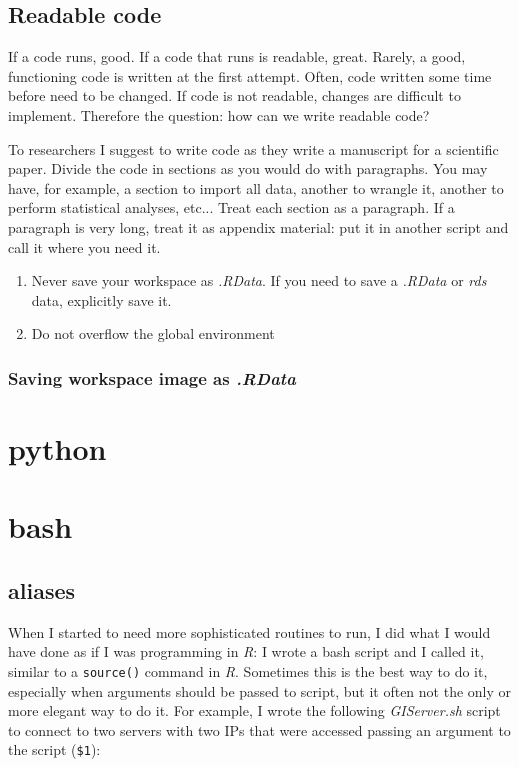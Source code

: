 \documentclass{book}
\begin{document}
\section{Readable code}
If a code runs, good. If a code that runs is readable, great. Rarely, a good, functioning code is written at the first attempt. Often, code written some time before need to be changed. If code is not readable, changes are difficult to implement. Therefore the question: how can we write readable code? 

To researchers I suggest to write code as they write a manuscript for a scientific paper. Divide the code in sections as you would do with paragraphs. You may have, for example, a section to import all data, another to wrangle it, another to perform statistical analyses, etc... Treat each section as a paragraph. If a paragraph is very long, treat it as appendix material: put it in another script and call it where you need it.

\begin{enumerate}
    \item Never save your workspace as \textit{.RData}. If you need to save a \textit{.RData} or \textit{rds} data, explicitly save it. 
    \item Do not overflow the global environment
\end{enumerate}

\subsection{Saving workspace image as \textit{.RData}}

\chapter{python}

\chapter{bash}
\lstset{language=bash}

\section{aliases}
When I started to need more sophisticated routines to run, I did what I would have done as if I was programming in \textit{R}: I wrote a bash script and I called it, similar to a \texttt{source()} command in \textit{R}. Sometimes this is the best way to do it, especially when arguments should be passed to script, but it often not the only or more elegant way to do it. For example, I wrote the following \textit{GIServer.sh} script to connect to two servers with two IPs that were accessed passing an argument to the script (\texttt{\$1}):
\end{document}
